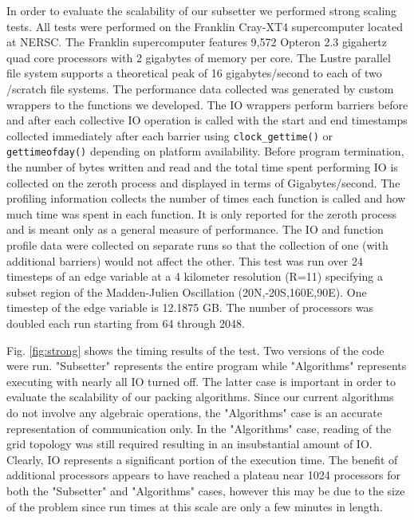 In order to evaluate the scalability of our subsetter we performed strong
scaling tests.  All tests were performed on the Franklin Cray-XT4
supercomputer\cite{franklin} located at NERSC\cite{NERSC}.  The Franklin
supercomputer features 9,572 Opteron 2.3 gigahertz quad core processors with 2
gigabytes of memory per core.  The Lustre parallel file system supports a
theoretical peak of 16 gigabytes/second to each of two /scratch file systems.
The performance data collected was generated by custom wrappers to the
functions we developed.  The IO wrappers perform barriers before and after
each collective IO operation is called with the start and end timestamps
collected immediately after each barrier using \verb=clock_gettime()= or
\verb=gettimeofday()= depending on platform availability.  Before program
termination, the number of bytes written and read and the total time spent
performing IO is collected on the zeroth process and displayed in terms of
Gigabytes/second.  The profiling information collects the number of times each
function is called and how much time was spent in each function.  It is only
reported for the zeroth process and is meant only as a general measure of
performance.  The IO and function profile data were collected on separate runs
so that the collection of one (with additional barriers) would not affect the
other.  This test was run over 24 timesteps of an edge variable at a 4
kilometer resolution (R=11) specifying a subset region of the Madden-Julien
Oscillation\cite{MJO} (20N,-20S,160E,90E).  One timestep of the edge variable
is 12.1875 GB.  The number of processors was doubled each run starting from 64
through 2048.

Fig. \ref{fig:strong} shows the timing results of the test.  Two versions of
the code were run.  "Subsetter" represents the entire program while
"Algorithms" represents executing with nearly all IO turned off.  The latter
case is important in order to evaluate the scalability of our packing
algorithms.  Since our current algorithms do not involve any algebraic
operations, the "Algorithms" case is an accurate representation of
communication only.  In the "Algorithms" case, reading of the grid topology was
still required resulting in an insubstantial amount of IO.  Clearly, IO
represents a significant portion of the execution time.  The benefit of
additional processors appears to have reached a plateau near 1024 processors for
both the "Subsetter" and "Algorithms" cases, however this may be due to the
size of the problem since run times at this scale are only a few minutes in
length.

